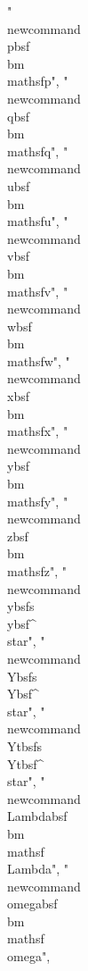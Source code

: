 {"\\newcommand{\\pbsf}{\\bm{\\mathsf{p}}}",
"\\newcommand{\\qbsf}{\\bm{\\mathsf{q}}}",
"\\newcommand{\\ubsf}{\\bm{\\mathsf{u}}}",
"\\newcommand{\\vbsf}{\\bm{\\mathsf{v}}}",
"\\newcommand{\\wbsf}{\\bm{\\mathsf{w}}}",
"\\newcommand{\\xbsf}{\\bm{\\mathsf{x}}}",
"\\newcommand{\\ybsf}{\\bm{\\mathsf{y}}}",
"\\newcommand{\\zbsf}{\\bm{\\mathsf{z}}}",
"\\newcommand{\\ybsfs}{\\ybsf^{\\star}}",
"\\newcommand{\\Ybsfs}{\\Ybsf^{\\star}}",
"\\newcommand{\\Ytbsfs}{\\Ytbsf^{\\star}}",
"\\newcommand{\\Lambdabsf}{\\bm{\\mathsf{\\Lambda}}}",
"\\newcommand{\\omegabsf}{\\bm{\\mathsf{\\omega}}}",
}

